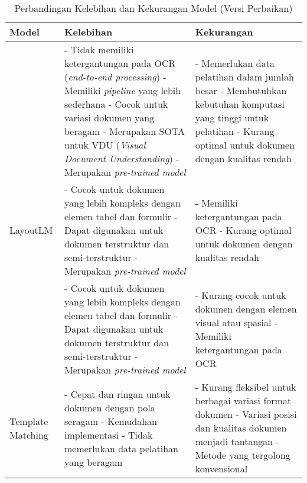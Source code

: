 \begin{table}[h!]
\caption{Perbandingan Kelebihan dan Kekurangan Model (Versi Perbaikan)}
\label{tab:model-comparison-fixed}
\begin{tabularx}{\textwidth}{| X | >{\RaggedRight}X | >{\RaggedRight}X |}
\hline
\textbf{Model} & \textbf{Kelebihan} & \textbf{Kekurangan} \\
\hline

\donut{} &
- Tidak memiliki ketergantungan pada OCR (\textit{end-to-end processing}) \newline
- Memiliki \textit{pipeline} yang lebih sederhana \newline
- Cocok untuk variasi dokumen yang beragam \newline
- Merupakan SOTA untuk VDU (\textit{Visual Document Understanding}) \newline
- Merupakan \textit{pre-trained model}
&
- Memerlukan data pelatihan dalam jumlah besar \newline
- Membutuhkan kebutuhan komputasi yang tinggi untuk pelatihan \newline
- Kurang optimal untuk dokumen dengan kualitas rendah
\\ \hline

LayoutLM &
- Cocok untuk dokumen yang lebih kompleks dengan elemen tabel dan formulir \newline
- Dapat digunakan untuk dokumen terstruktur dan semi-terstruktur \newline
- Merupakan \textit{pre-trained model}
&
- Memiliki ketergantungan pada OCR \newline
- Kurang optimal untuk dokumen dengan kualitas rendah
\\ \hline

\bert{} &
- Cocok untuk dokumen yang lebih kompleks dengan elemen tabel dan formulir \newline
- Dapat digunakan untuk dokumen terstruktur dan semi-terstruktur \newline
- Merupakan \textit{pre-trained model}
&
- Kurang cocok untuk dokumen dengan elemen visual atau spasial \newline
- Memiliki ketergantungan pada OCR
\\ \hline

Template Matching &
- Cepat dan ringan untuk dokumen dengan pola seragam \newline
- Kemudahan implementasi \newline
- Tidak memerlukan data pelatihan yang beragam
&
- Kurang fleksibel untuk berbagai variasi format dokumen \newline
- Variasi posisi dan kualitas dokumen menjadi tantangan \newline
- Metode yang tergolong konvensional
\\ \hline


\end{tabularx}
\end{table}
